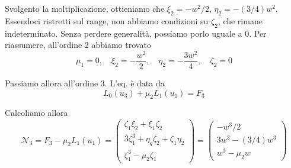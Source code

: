 \documentclass{report}
\begin{document}
\begin{example}
    Svolgento la moltiplicazione, ottieniamo che $\xi_2 = -w^2/2$, $\eta_2 = -(3/4)w^2$. Essendoci ristretti sul range, non abbiamo condizioni su $\zeta_2$, che rimane indeterminato. Senza perdere generalità, possiamo porlo uguale a 0. Per riassumere, all'ordine 2 abbiamo trovato 
    \begin{equation}
        \mu_1 = 0, \quad \xi_2 = -\frac{w^2}{2}, \quad \eta_2 = -\frac{3w^2}{4}, \quad \zeta_2 = 0
    \end{equation}

    Passiamo allora all'ordine 3. L'eq. è data da 
    \begin{equation}
        L_0(u_3) + \mu_2L_1(u_1) = F_3
    \end{equation}

    Calcoliamo allora 
    \begin{equation}
        \mathcal{N}_3 = F_3 - \mu_2L_1(u_1) =\begin{pmatrix}
            \zeta_1\xi_2 + \xi_1\zeta_2 \\ 3\zeta_1^3 + \eta_q\zeta_2 + \zeta_1\eta_2 \\ \zeta_1^3 - \mu_2\zeta_1
        \end{pmatrix} = \begin{pmatrix}
            -w^3/2 \\ 3w^3 -(3/4)w^3\\ w^3 -\mu_2w
        \end{pmatrix}
    \end{equation}


\end{example}
\end{document}
